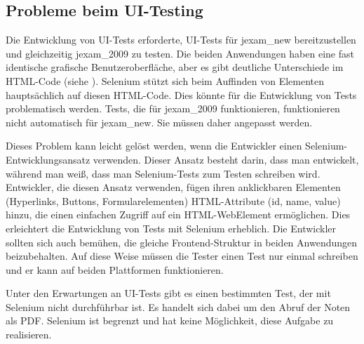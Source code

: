 \subsection{Probleme beim UI-Testing}


Die Entwicklung von UI-Tests erforderte, UI-Tests für \gls{jexam_new}
bereitzustellen und gleichzeitig \gls{jexam_2009} zu testen. Die beiden
Anwendungen haben eine fast identische grafische Benutzeroberfläche,
aber es gibt deutliche Unterschiede im HTML-Code (siehe ).
Selenium stützt sich beim Auffinden von Elementen hauptsächlich auf
diesen HTML-Code. Dies könnte für die Entwicklung von Tests
problematisch werden. Tests, die für \gls{jexam_2009} funktionieren,
funktionieren  nicht automatisch  für \gls{jexam_new}. Sie müssen daher
angepasst werden.


Dieses Problem kann leicht gelöst werden, wenn die Entwickler
einen Selenium-Entwicklungsansatz verwenden. Dieser Ansatz
besteht darin, dass man entwickelt, während man weiß, dass man
Selenium-Tests zum Testen schreiben wird. Entwickler, die diesen
Ansatz verwenden, fügen ihren anklickbaren Elementen (Hyperlinks,
Buttons, Formularelementen) HTML-Attribute (id, name, value) hinzu,
die einen einfachen Zugriff auf ein HTML-WebElement ermöglichen.
Dies erleichtert die Entwicklung von Tests mit Selenium erheblich.
Die Entwickler sollten sich auch bemühen, die gleiche
Frontend-Struktur in beiden Anwendungen beizubehalten. Auf diese
Weise müssen die Tester einen Test nur einmal schreiben und er
kann auf beiden Plattformen funktionieren.

Unter den Erwartungen an UI-Tests gibt es einen bestimmten Test,
der mit Selenium nicht durchführbar ist. Es handelt sich dabei um
den Abruf der Noten als PDF. Selenium ist begrenzt und hat keine
Möglichkeit, diese Aufgabe zu realisieren.

